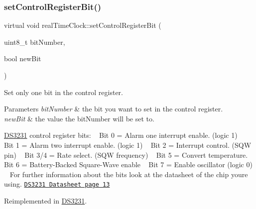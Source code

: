 \mbox{\label{classreal_time_clock_af9b7db85f78d01060772bdb3b397ea3c}} 
\subsubsection{\texorpdfstring{set\+Control\+Register\+Bit()}{setControlRegisterBit()}}
{\footnotesize\ttfamily virtual void real\+Time\+Clock\+::set\+Control\+Register\+Bit (\begin{DoxyParamCaption}\item[{uint8\+\_\+t}]{bit\+Number,  }\item[{bool}]{new\+Bit }\end{DoxyParamCaption})\hspace{0.3cm}{\ttfamily [virtual]}}



Set only one bit in the control register. 


\begin{DoxyParams}{Parameters}
{\em bit\+Number} & the bit you want to set in the control register. \\
\hline
{\em new\+Bit} & the value the bit\+Number will be set to.\\
\hline
\end{DoxyParams}
\mbox{\hyperlink{class_d_s3231}{D\+S3231}} control register bits\+: ~\newline
 Bit 0 = Alarm one interrupt enable. (logic 1) ~\newline
 Bit 1 = Alarm two interrupt enable. (logic 1) ~\newline
 Bit 2 = Interrupt control. (S\+QW pin) ~\newline
 Bit 3/4 = Rate select. (S\+QW frequency) ~\newline
 Bit 5 = Convert temperature. ~\newline
 Bit 6 = Battery-\/\+Backed Square-\/\+Wave enable ~\newline
 Bit 7 = Enable oscillator (logic 0) ~\newline
 For further information about the bits look at the datasheet of the chip you\textquotesingle{}re using. \href{https://datasheets.maximintegrated.com/en/ds/DS3231.pdf}{\tt D\+S3231 Datasheet page 13} 

Reimplemented in \mbox{\hyperlink{class_d_s3231_a9ed1255adb58ecd03a541a4d481496c4}{D\+S3231}}.

